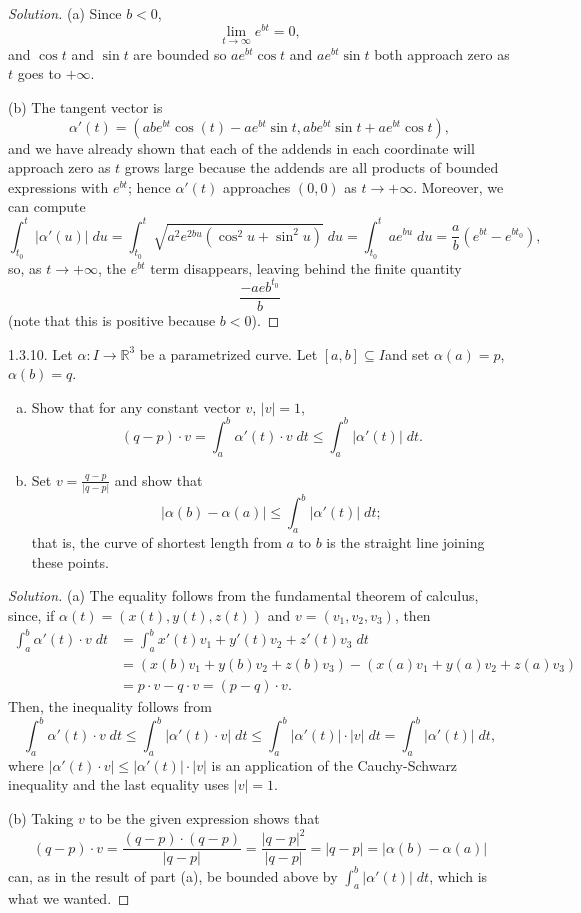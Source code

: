 \documentclass[11pt]{scrartcl}
\providecommand{\RR}{\mathbb R}
\providecommand{\ii}{\item}
\providecommand{\dif}{\;d}
\newenvironment{soln}{\begin{proof}[Solution]}{\end{proof}}
\begin{document}
\begin{soln}
	(a) Since $b < 0$,
	\[\lim_{t\to\infty} e^{bt} = 0,\]
	and $\cos t$ and $\sin t$ are bounded so $ae^{bt}\cos t$
	and $ae^{bt}\sin t$ both approach zero as $t$ goes to $+\infty$.
	
	(b) The tangent vector is
	\[\alpha'(t) =
	(abe^{bt}\cos(t) - ae^{bt}\sin t, abe^{bt}\sin t + ae^{bt}\cos t),\]
	and we have already shown that each of the addends in each coordinate
	will approach zero as $t$ grows large because the addends are all
	products of bounded expressions with $e^{bt}$;
	hence $\alpha'(t)$ approaches $(0,0)$ as $t\to+\infty$.
	Moreover, we can compute
	\[\int_{t_0}^t |\alpha'(u)|\dif u=
	\int_{t_0}^t \sqrt{a^2e^{2bu}(\cos^2u+\sin^2u)}\dif u
	= \int_{t_0}^t ae^{bu}\dif u = \frac{a}{b}(e^{bt} - e^{bt_0}),\]
	so, as $t\to+\infty$, the $e^{bt}$ term disappears, leaving behind
	the finite quantity
	\[\frac{-aeb^{t_0}}{b}\]
	(note that this is positive because $b < 0$).
\end{soln}

\begin{problem*}1.3.10.
	Let $\alpha\colon I\to\RR^3$ be a parametrized curve.
	Let $[a,b]\subseteq I$and set $\alpha(a) = p$, $\alpha(b) = q$.
	\begin{enumerate}[(a)]
		\ii Show that for any constant vector $v$, $|v| = 1$,
		\[(q-p)\cdot v = \int_a^b \alpha'(t)\cdot v\dif t
		\le \int_a^b |\alpha'(t)|\dif t.\]
		\ii Set $v = \frac{q-p}{|q-p|}$ and show that
		\[|\alpha(b) - \alpha(a)|\le \int_a^b |\alpha'(t)|\dif t;\]
		that is, the curve of shortest length from $a$ to $b$
		is the straight line joining these points.
	\end{enumerate}
\end{problem*}

\begin{soln}
	(a) The equality follows from the fundamental theorem of calculus,
	since, if $\alpha(t) = (x(t), y(t), z(t))$ and $v = (v_1, v_2, v_3)$, then
	\begin{align*}
		\int_a^b \alpha'(t)\cdot v\dif t
		&= \int_a^b x'(t)v_1 + y'(t)v_2 + z'(t)v_3\dif t\\
		&= (x(b)v_1 + y(b)v_2 + z(b)v_3) - (x(a)v_1 + y(a)v_2 + z(a)v_3)\\
		&= p\cdot v - q\cdot v = (p-q)\cdot v.
	\end{align*}
	Then, the inequality follows from
	\[\int_a^b \alpha'(t)\cdot v\dif t
	\le \int_a^b |\alpha'(t)\cdot v|\dif t
	\le \int_a^b |\alpha'(t)|\cdot|v|\dif t
	= \int_a^b |\alpha'(t)|\dif t,\]
	where $|\alpha'(t)\cdot v|\le|\alpha'(t)|\cdot|v|$ is an application
	of the Cauchy-Schwarz inequality and the last equality uses $|v| = 1$.
	
	(b) Taking $v$ to be the given expression shows that
	\[(q-p)\cdot v = \frac{(q-p)\cdot (q-p)}{|q-p|} =
	\frac{|q-p|^2}{|q-p|} = |q-p| = |\alpha(b)-\alpha(a)|\]
	can, as in the result of part (a),
	be bounded above by $\int_a^b |\alpha'(t)|\dif t$,
	which is what we wanted.
\end{soln}
\end{document}
